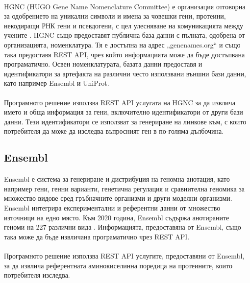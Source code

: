 \documentclass[pdftex,cyrillic,14pt,a4page,twoside,openright]{extreport}
\begin{document}
\paragraph{}
HGNC (HUGO Gene Name Nomenclature Committee) е организация отговорна за одобрението на уникални символи и имена за човешки гени, протеини, некодиращи РНК гени и псевдогени, с цел улесняване на комуникацията между учените \cite{povey2001hugo}. HGNC също предоставят публична база данни с пълната, одобрена от организацията, номенклатура. Тя е достъпна на адрес „genenames.org“ и също така предоставя REST API, чрез който информацията може да бъде достъпвана програматично. Освен номенклатурата, базата данни предоставя и идентификатори за артефакта на различни често използвани външни бази данни, като например Ensembl и UniProt.

\paragraph{}
Програмното решение използва REST API услугата на HGNC за да извлича името и обща информация за гени, включително идентификатори от други бази данни. Тези идентификатори се използват за генериране на линкове към, с които потребителя да може да изследва въпросният ген в по-голяма дълбочина.

\subsection{Ensembl}\label{sec:ensembl}
\paragraph{}
Ensembl е система за генериране и дистрибуция на геномна анотация, като например гени, генни варианти, генетична регулация и сравнителна геномика за множество видове сред гръбначните организми и други моделни организми. Ensembl интегрира експериментални и референтни данни от множество източници на едно място. Към 2020 година, Ensembl съдържа анотираните геноми на 227 различни вида \cite{yates2020}. Информацията, предоставяна от Ensembl, също така може да бъде извличана програматично чрез REST API.

\paragraph{}
Програмното решение използва REST API услугите, предоставяни от Ensembl, за да извлича референтната аминокиселинна поредица на протеините, които потребителя изследва.
\end{document}
